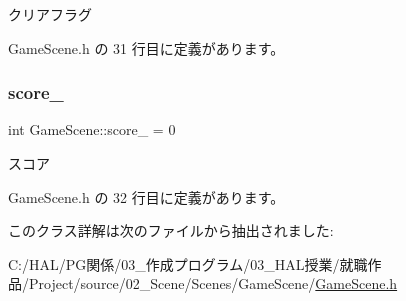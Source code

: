 クリアフラグ 



 Game\+Scene.\+h の 31 行目に定義があります。

\mbox{\label{class_game_scene_afe49ee089b9ad8415f7ab432a3c554aa}} 
\subsubsection{\texorpdfstring{score\+\_\+}{score\_}}
{\footnotesize\ttfamily int Game\+Scene\+::score\+\_\+ = 0\hspace{0.3cm}{\ttfamily [private]}}



スコア 



 Game\+Scene.\+h の 32 行目に定義があります。



このクラス詳解は次のファイルから抽出されました\+:\begin{DoxyCompactItemize}
\item 
C\+:/\+H\+A\+L/\+P\+G関係/03\+\_\+作成プログラム/03\+\_\+\+H\+A\+L授業/就職作品/\+Project/source/02\+\_\+\+Scene/\+Scenes/\+Game\+Scene/\mbox{\hyperlink{_game_scene_8h}{Game\+Scene.\+h}}\end{DoxyCompactItemize}
